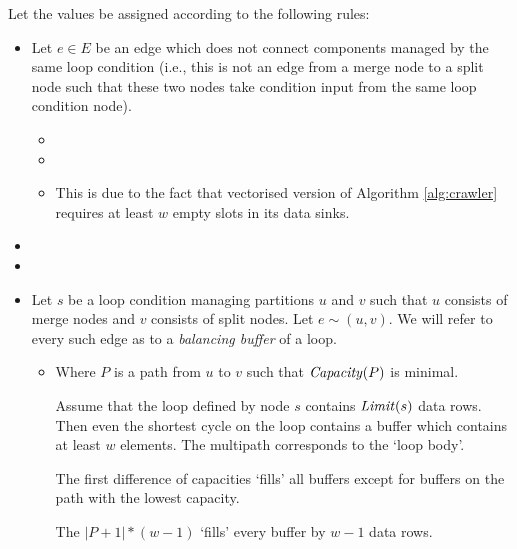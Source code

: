   Let the values be assigned according to the following rules:
  \begin{itemize}
    \item Let $e \in E$ be an edge which does not connect components managed by the same loop condition (i.e., this is not an edge from a merge node to a split node such that these two nodes take condition input from the same loop condition node). 
    \begin{itemize}
      \item {}
      \item {}
      \item {}
        
        \textnormal{This is due to the fact that vectorised version of Algorithm \ref{alg:crawler} requires at least $w$ empty slots in its data sinks.}

    \end{itemize}
  \item {}
  \item {} 
  \item Let $s$ be a loop condition managing partitions $u$ and $v$ such that $u$ consists of merge nodes and $v$ consists of split nodes. Let $e \sim (u,v)$. We will refer to every such edge as to a \emph{balancing buffer} of a loop.
    \begin{itemize}
      \item {} 

        Where $P$ is a path from $u$ to $v$ such that $\mf{capacity}(P)$ is minimal.

        \textnormal{ Assume that the loop defined by node $s$ contains $\mf{limit}(s)$ data rows. Then even the shortest cycle on the loop contains a buffer which contains at least $w$ elements. The multipath corresponds to the `loop body'. }
        
        \textnormal{The first difference of capacities `fills' all buffers except for buffers on the path with the lowest capacity. }
        
        \textnormal{The $| P +1 | * (w-1)$ `fills' every buffer by $w-1$ data rows. }
        

\end{itemize}
\end{itemize}
